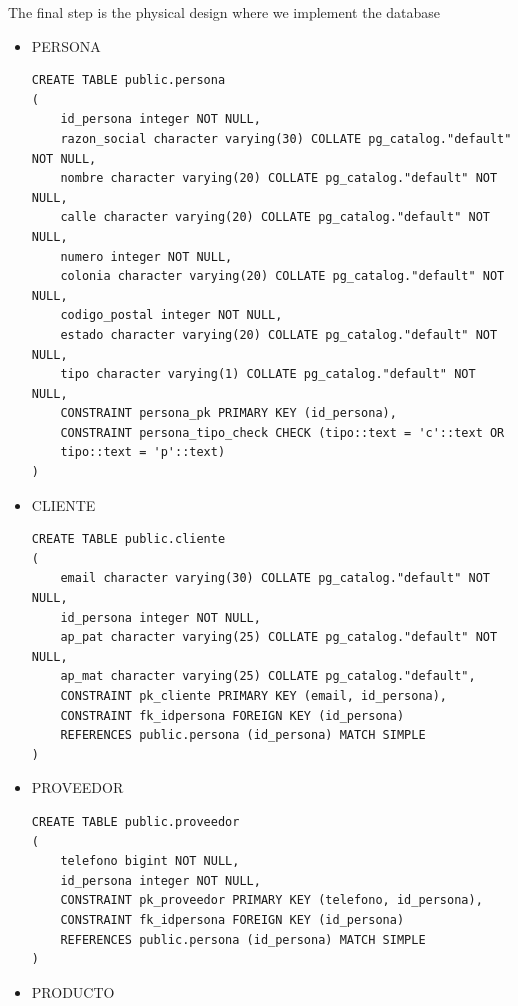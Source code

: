 \documentclass{article}
\begin{document}
The final step is the physical design where we implement the database\\

\begin{itemize}
\item PERSONA\\

\begin{lstlisting}
CREATE TABLE public.persona
(
	id_persona integer NOT NULL,
	razon_social character varying(30) COLLATE pg_catalog."default" NOT NULL,
	nombre character varying(20) COLLATE pg_catalog."default" NOT NULL,
	calle character varying(20) COLLATE pg_catalog."default" NOT NULL,
	numero integer NOT NULL,
	colonia character varying(20) COLLATE pg_catalog."default" NOT NULL,
	codigo_postal integer NOT NULL,
	estado character varying(20) COLLATE pg_catalog."default" NOT NULL,
	tipo character varying(1) COLLATE pg_catalog."default" NOT NULL,
	CONSTRAINT persona_pk PRIMARY KEY (id_persona),
	CONSTRAINT persona_tipo_check CHECK (tipo::text = 'c'::text OR 
	tipo::text = 'p'::text)
)
\end{lstlisting}

\item CLIENTE\\

\begin{lstlisting}
CREATE TABLE public.cliente
(
	email character varying(30) COLLATE pg_catalog."default" NOT NULL,
	id_persona integer NOT NULL,
	ap_pat character varying(25) COLLATE pg_catalog."default" NOT NULL,
	ap_mat character varying(25) COLLATE pg_catalog."default",
	CONSTRAINT pk_cliente PRIMARY KEY (email, id_persona),
	CONSTRAINT fk_idpersona FOREIGN KEY (id_persona)
	REFERENCES public.persona (id_persona) MATCH SIMPLE
)
\end{lstlisting}

\item PROVEEDOR\\

\begin{lstlisting}
CREATE TABLE public.proveedor
(
	telefono bigint NOT NULL,
	id_persona integer NOT NULL,
	CONSTRAINT pk_proveedor PRIMARY KEY (telefono, id_persona),
	CONSTRAINT fk_idpersona FOREIGN KEY (id_persona)
	REFERENCES public.persona (id_persona) MATCH SIMPLE
)
\end{lstlisting}

\item PRODUCTO\\


\end{itemize}
\end{document}

